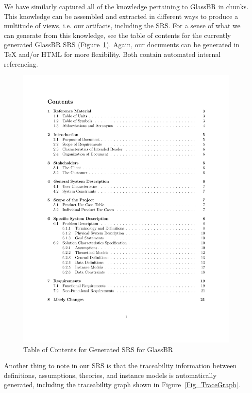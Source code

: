 \documentclass[sigconf]{acmart}
\begin{document}
We have similarly captured all of the knowledge pertaining to GlassBR in chunks.
This knowledge can be assembled and extracted in different ways to produce a 
multitude of views, i.e. our artifacts, including the SRS. For a sense of what 
we can generate from this knowledge, see the table of contents for the currently
generated GlassBR SRS (Figure~\ref{Fig_ToCGlassBRSRS}). Again, our documents can
be generated in TeX and/or HTML for more flexibility. Both contain automated 
internal referencing.

\begin{figure}
\begin{center}
\includegraphics[scale=0.5]{./figures/TofC.pdf}
\end{center}
\caption{Table of Contents for Generated SRS for GlassBR}
\label{Fig_ToCGlassBRSRS}
\end{figure}

Another thing to note in our SRS is that the traceability information between
definitions, assumptions, theories, and instance models is automatically 
generated, including the traceability graph shown in 
Figure~\ref{Fig_TraceGraph}.
\end{document}
